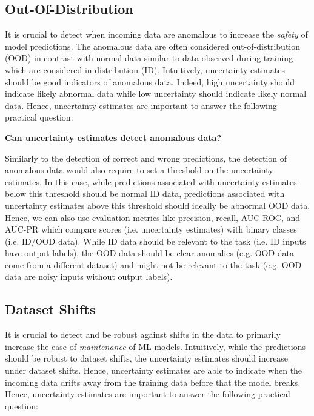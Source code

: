 \subsection{Out-Of-Distribution}

It is crucial to detect when incoming data are anomalous to increase the \emph{safety} of model predictions. The anomalous data are often considered out-of-distribution (OOD) in contrast with normal data similar to data observed during training which are considered in-distribution (ID). Intuitively, uncertainty estimates should be good indicators of anomalous data. Indeed, high uncertainty should indicate likely abnormal data while low uncertainty should indicate likely normal data. Hence, uncertainty estimates are important to answer the following practical question:

\begin{center}
    \textbf{Can uncertainty estimates detect anomalous data?}
\end{center}

Similarly to the detection of correct and wrong predictions, the detection of anomalous data would also require to set a threshold on the uncertainty estimates. In this case, while predictions associated with uncertainty estimates below this threshold should be normal ID data, predictions associated with uncertainty estimates above this threshold should ideally be abnormal OOD data. Hence, we can also use evaluation metrics like precision, recall, AUC-ROC, and AUC-PR which compare scores (i.e. uncertainty estimates) with binary classes (i.e. ID/OOD data). While ID data should be relevant to the task (i.e. ID inputs have output labels), the OOD data should be clear anomalies (e.g. OOD data come from a different dataset) and might not be relevant to the task (e.g. OOD data are noisy inputs without output labels).

\subsection{Dataset Shifts}

It is crucial to detect and be robust against shifts in the data to primarily increase the ease of \emph{maintenance} of ML models. Intuitively, while the predictions should be robust to dataset shifts, the uncertainty estimates should increase under dataset shifts. Hence, uncertainty estimates are able to indicate when the incoming data drifts away from the training data before that the model breaks. Hence, uncertainty estimates are important to answer the following practical question:

